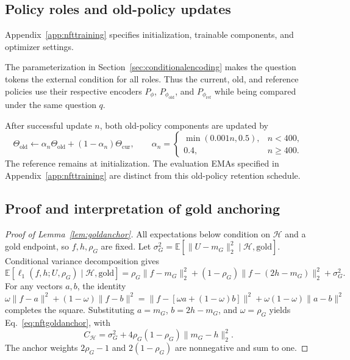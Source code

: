\documentclass{article}
\newcommand{\E}{\mathbb{E}}
\begin{document}
\subsection{Policy roles and old-policy updates}
\label{sec:nftjoint}

Appendix~\ref{app:nfttraining} specifies initialization, trainable components, and optimizer settings.

The parameterization in Section~\ref{sec:conditionalencoding} makes the question tokens the external condition for all roles. Thus the current, old, and reference policies use their respective encoders $P_\phi$, $P_{\phi_{\mathrm{old}}}$, and $P_{\phi_{\mathrm{ref}}}$ while being compared under the same question $q$.

After successful update $n$, both old-policy components are updated by
\begin{equation}
 \Theta_{\mathrm{old}}\leftarrow \alpha_n\Theta_{\mathrm{old}}+(1-\alpha_n)\Theta_{\mathrm{cur}},
 \qquad \alpha_n=\begin{cases}\min(0.001n,0.5),&n<400,\\0.4,&n\ge400.\end{cases}
 \label{eq:nftoldema}
\end{equation}
The reference remains at initialization. The evaluation EMAs specified in Appendix~\ref{app:nfttraining} are distinct from this old-policy retention schedule.

\subsection{Proof and interpretation of gold anchoring}
\label{app:nftgoldproof}

\begin{proof}[Proof of Lemma~\ref{lem:goldanchor}]
All expectations below condition on $\mathcal H$ and a gold endpoint, so $f,h,\rho_G$ are fixed. Let $\sigma_G^2=\E[\|U-m_G\|_2^2\mid\mathcal H,\mathrm{gold}]$. Conditional variance decomposition gives
\begin{equation}
 \E[\ell_1(f,h;U,\rho_G)\mid\mathcal H,\mathrm{gold}]
 =\rho_G\|f-m_G\|_2^2
 +(1-\rho_G)\|f-(2h-m_G)\|_2^2+\sigma_G^2.
\end{equation}
For any vectors $a,b$, the identity $\omega\|f-a\|^2+(1-\omega)\|f-b\|^2=\|f-[\omega a+(1-\omega)b]\|^2+\omega(1-\omega)\|a-b\|^2$ completes the square. Substituting $a=m_G$, $b=2h-m_G$, and $\omega=\rho_G$ yields Eq.~\eqref{eq:nftgoldanchor}, with
\begin{equation}
 C_{\mathcal H}=\sigma_G^2+4\rho_G(1-\rho_G)\|m_G-h\|_2^2.
\end{equation}
The anchor weights $2\rho_G-1$ and $2(1-\rho_G)$ are nonnegative and sum to one.
\end{proof}
\end{document}
